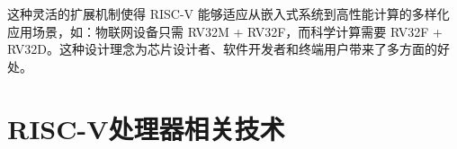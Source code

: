 \begin{enumerate}[label={(\arabic*)},itemsep=0pt, parsep=0pt]
	      这种灵活的扩展机制使得 RISC-V 能够适应从嵌入式系统到高性能计算的多样化应用场景，如：物联网设备只需 RV32M + RV32F，而科学计算需要 RV32F + RV32D。这种设计理念为芯片设计者、软件开发者和终端用户带来了多方面的好处。

\end{enumerate}
\section{RISC-V处理器相关技术}

